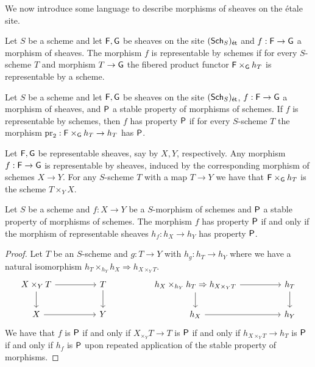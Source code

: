 We now introduce some language to describe morphisms of sheaves on the \'{e}tale site. 
\begin{definition}\label{def: morphism of etale sheaves representable by schemes}
    Let $S$ be a scheme and let $\mathsf{F},\mathsf{G}$ be sheaves on the site $(\mathsf{Sch}_{S})_{\mathsf{\acute{e}t}}$ and $f:\mathsf{F}\to\mathsf{G}$ a morphism of sheaves. The morphism $f$ is representable by schemes if for every $S$-scheme $T$ and morphism $T\to \mathsf{G}$ the fibered product functor $\mathsf{F}\times_{\mathsf{G}}h_{T}$ is representable by a scheme. 
\end{definition}
\begin{definition}
    Let $S$ be a scheme and let $\mathsf{F},\mathsf{G}$ be sheaves on the site $(\mathsf{Sch}_{S})_{\mathsf{\acute{e}t}}$, $f:\mathsf{F}\to\mathsf{G}$ a morphism of sheaves, and $\mathsf{P}$ a stable property of morphisms of schemes. If $f$ is representable by schemes, then $f$ has property $\mathsf{P}$ if for every $S$-scheme $T$ the morphism $\mathrm{pr}_{2}:\mathsf{F}\times_{\mathsf{G}}h_{T}\to h_{T}$ has $\mathsf{P}$. 
\end{definition}
\begin{example}
    Let $\mathsf{F},\mathsf{G}$ be representable sheaves, say by $X,Y$, respectively. Any morphism $f:\mathsf{F}\to\mathsf{G}$ is representable by sheaves, induced by the corresponding morphism of schemes $X\to Y$. For any $S$-scheme $T$ with a map $T\to Y$ we have that $\mathsf{F}\times_{\mathsf{G}}h_{T}$ is the scheme $T\times_{Y}X$. 
\end{example}
\begin{lemma}\label{lem: morphisms of schemes and etale sheaves}
    Let $S$ be a scheme and $f:X\to Y$ be a $S$-morphism of schemes and $\mathsf{P}$ a stable property of morphisms of schemes. The morphism $f$ has property $\mathsf{P}$ if and only if the morphism of representable sheaves $h_{f}:h_{X}\to h_{Y}$ has property $\mathsf{P}$. 
\end{lemma}
\begin{proof}
    Let $T$ be an $S$-scheme and $g:T\to Y$ with $h_{g}:h_{T}\to h_{Y}$ where we have a natural isomorphism $h_{T}\times_{h_{Y}}h_{X}\Longrightarrow h_{X\times_{Y}T}$.
    $$%
    \begin{tikzcd}
        {X\times_{Y}T} && T && {h_{X}\times_{h_{Y}}h_{T}\Rightarrow h_{X\times_{Y}T}} && {h_{T}} \\
        X && Y && {h_{X}} && {h_{Y}}
        \arrow[from=2-1, to=2-3]
        \arrow[from=1-1, to=1-3]
        \arrow[from=1-3, to=2-3]
        \arrow[from=1-1, to=2-1]
        \arrow[from=2-5, to=2-7]
        \arrow[from=1-5, to=1-7]
        \arrow[from=1-5, to=2-5]
        \arrow[from=1-7, to=2-7]
    \end{tikzcd}$$
    We have that $f$ is $\mathsf{P}$ if and only if $X_{\times_{Y}}T\to T$ is $\mathsf{P}$ if and only if $h_{X\times_{Y}T}\to h_{T}$ is $\mathsf{P}$ if and only if $h_{f}$ is $\mathsf{P}$ upon repeated application of the stable property of morphisms. 
\end{proof}
